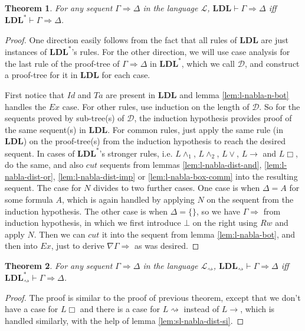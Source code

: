 \documentclass[12pt,a4paper]{article}
\theoremstyle{plain}
\newtheorem{thm}{Theorem}[section]
\theoremstyle{definition}
\begin{document}
\begin{thm}\label{thm:ldl-eq-ldls}
	For any sequent $\Gamma \Rightarrow \Delta$ in the language $\mathcal{L}$, $\mathbf{LDL} \vdash \Gamma \Rightarrow \Delta$ iff $\mathbf{LDL}^* \vdash \Gamma \Rightarrow \Delta$.
\end{thm}
\begin{proof}
	One direction easily follows from the fact that all rules of $\mathbf{LDL}$ are just instances of $\mathbf{LDL}^*$'s rules.
	For the other direction, we will use case analysis for the last rule of the proof-tree of $\Gamma \Rightarrow \Delta$ in $\mathbf{LDL}^*$, which we call $\mathcal{D}$, and construct a proof-tree for it in $\mathbf{LDL}$ for each case.
	
	First notice that $Id$ and $Ta$ are present in $\mathbf{LDL}$ and lemma \ref{lem:l-nabla-n-bot} handles the $Ex$ case.
	For other rules, use induction on the length of $\mathcal{D}$.
	So for the sequents proved by sub-tree(s) of $\mathcal{D}$, the induction hypothesis provides proof of the same sequent(s) in $\mathbf{LDL}$.
	For common rules, just apply the same rule (in $\mathbf{LDL}$) on the proof-tree(s) from the induction hypothesis to reach the desired sequent.
	In cases of $\mathbf{LDL}^*$'s stronger rules, i.e. $L\land_1$, $L\land_2$, $L\lor$, $L\rightarrow$ and $L\Box$, do the same, and also $cut$ sequents from lemmas \ref{lem:l-nabla-dist-and}, \ref{lem:l-nabla-dist-or}, \ref{lem:l-nabla-dist-imp} or \ref{lem:l-nabla-box-comm} into the resulting sequent.
	The case for $N$ divides to two further cases. One case is when $\Delta = A$ for some formula $A$, which is again handled by applying $N$ on the sequent from the induction hypothesis.
	The other case is when $\Delta = \{\}$, so we have $\Gamma \Rightarrow$ from induction hypothesis, in which we first introduce $\bot$ on the right using $Rw$ and apply $N$.
	Then we can $cut$ it into the sequent from lemma \ref{lem:l-nabla-bot}, and then into $Ex$, just to derive $\nabla \Gamma \Rightarrow$ as was desired.
\end{proof}

\begin{thm}\label{thm:sldl-eq-sldls}
	For any sequent $\Gamma \Rightarrow \Delta$ in the language $\mathcal{L}_{\rightsquigarrow}$, $\mathbf{LDL}_{\rightsquigarrow} \vdash \Gamma \Rightarrow \Delta$ iff $\mathbf{LDL}^*_{\rightsquigarrow} \vdash \Gamma \Rightarrow \Delta$.
\end{thm}
\begin{proof}
	The proof is similar to the proof of previous theorem, except that we don't have a case for $L\Box$ and there is a case for $L\rightsquigarrow$ instead of $L\rightarrow$, which is handled similarly, with the help of lemma \ref{lem:sl-nabla-dist-si}.
\end{proof}
\end{document}
